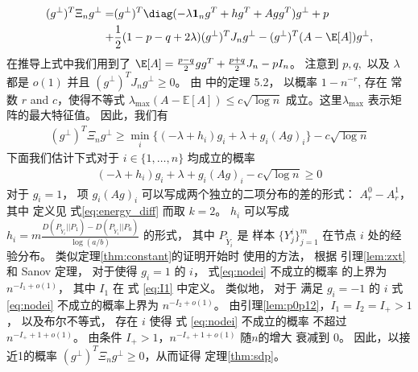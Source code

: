 \begin{align*}
    (g^{\perp})^T \Xi_n g^{\perp} 
    =& (g^{\perp})^T \diag( -\lambda \mathbf{1}_ng^T+hg^T + Agg^T) g^{\perp} + p \\
    +& \frac{1}{2}(1-p-q+2\lambda)(g^{\perp})^TJ_n g^{\perp}
    -(g^{\perp})^T(A-\E[A])g^{\perp},
\end{align*}
在推导上式中我们用到了 $\E[A] = \frac{p-q}{2}gg^T + \frac{p+q}{2}J_n - pI_n$。
注意到 $p,q,$ 以及 $\lambda$ 都是 $o(1)$ 并且
$(g^{\perp})^TJ_n g^{\perp}\ge 0$。
由 \citet{lei2015consistency} 中的定理 5.2，
以概率 $1-n^{-r}$, 存在
常数 $r$ and $c$，使得不等式 $\lambda_{\max}(A-\mathbb{E}[A]) \leq c\sqrt{\log n}$
成立。这里$\lambda_{\max}$ 表示矩阵的最大特征值。
因此，我们有
\begin{align}\label{eq:lastterm}
    (g^{\perp})^T \Xi_n g^{\perp} \geq \min_i\{(-\lambda + h_i) g_i+\lambda + g_i (Ag)_i \} - c \sqrt{\log n}
\end{align}
下面我们估计下式对于 $i\in\{1,\ldots,n\}$ 均成立的概率
\begin{align}\label{eq:nodei}
    (-\lambda + h_i) g_i+\lambda + g_i (Ag)_i  - c \sqrt{\log n}\ge 0
\end{align}
对于 $g_i=1$，
项 $g_i(Ag)_i$ 可以写成两个独立的二项分布的差的形式：
$A_r^0-A_r^1$，其中 定义见 式\eqref{eq:energy_diff} 而取 $k=2$。
$h_i$ 可以写成 $h_i=m \frac{D(P_{\widetilde{Y}_i} || P_1) - D(P_{\widetilde{Y}_i} || P_0) }{\log (a /b)}$
的形式，
其中 $P_{\widetilde{Y}_i}$ 是
样本 $\{Y^i_j\}^m_{j=1}$ 在节点 $i$ 处的经验分布。
类似定理\ref{thm:constant}的证明开始时
使用的方法，
根据 引理\ref{lem:zxt} 和  Sanov 定理，
对于使得 $g_i=1$ 的 $i$， 
式\eqref{eq:nodei} 不成立的概率
的上界为
$n^{-I_1 + o(1)}$，
其中 $I_1$ 在 式 \eqref{eq:I1} 中定义。
类似地，
对于 满足 $g_i=-1$ 的  $i$
式 \eqref{eq:nodei} 不成立的概率上界为 
$n^{-I_2 + o(1)}$。
由引理\ref{lem:p0p12}，$I_1=I_2=I_+>1$，
以及布尔不等式，  存在 $i$ 使得 式 \eqref{eq:nodei} 不成立的概率 不超过 $n^{-I_+ + 1 + o(1)}$。
由条件 $I_+>1$，$n^{-I_+ + 1 + o(1)}$ 随$n$的增大 衰减到 $0$。
 因此，以接近1的概率 $(g^{\perp})^T \Xi_n g^{\perp}\ge 0$，从而证得 定理\ref{thm:sdp}。 

